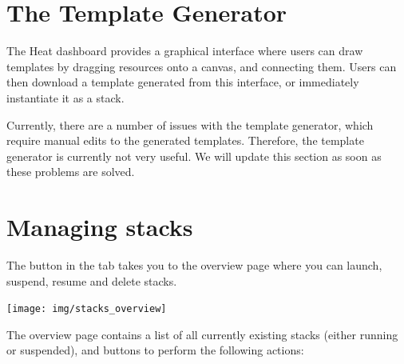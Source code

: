 \section{The Template Generator}\label{sec:template-generator}
The Heat dashboard provides a graphical interface where users can draw
templates by dragging resources onto a canvas, and connecting them.
Users can then download a template generated from this interface, or
immediately instantiate it as a stack.

 Currently, there are a number of issues with the
template generator, which require manual edits to the generated
templates.  Therefore, the template generator is currently not very
useful.  We will update this section as soon as these problems are
solved.

\section{Managing stacks}\label{sec:managing-stacks}
The  button in the  tab takes you
to the overview page where you can launch, suspend, resume and delete
stacks.
\begin{center}
  \texttt{[image: img/stacks\_overview]}
\end{center}
The overview page contains a list of all currently existing stacks
(either running or suspended), and buttons to perform the following
actions:

